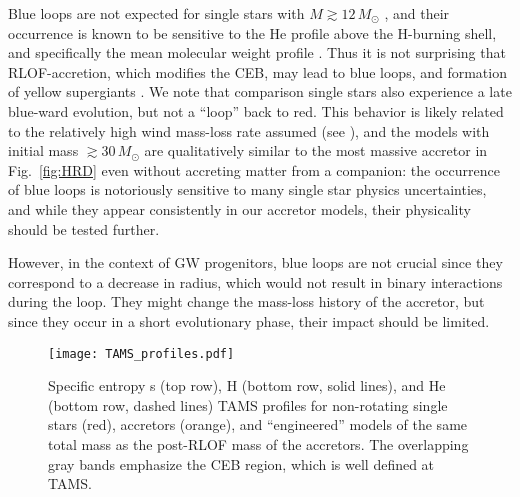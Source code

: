 \documentclass[twocolumn,twocolappendix,trackchanges]{aastex63}
\DeclareRobustCommand{\Figref}[1]{Fig.~\ref{#1}}
\begin{document}
Blue loops are not expected for single stars with
$M\gtrsim 12\,M_\odot$ \citep[e.g.,][]{walmswell:2015}, and their
occurrence is known to be sensitive to the He profile above the
H-burning shell, and specifically the mean molecular weight profile
\citep{walmswell:2015, farrell:22}. Thus it is not surprising that
RLOF-accretion, which modifies the CEB,
may lead to blue loops, and formation of yellow supergiants
\citep[e.g.,][]{dorn-wallenstein:20}. We note that comparison single
stars also experience a late blue-ward evolution, but not a ``loop''
back to red. This behavior is likely related to the relatively high
wind mass-loss rate assumed (see \citealt{renzo:2017}), and the models
with initial mass $\gtrsim 30\,M_\odot$ are qualitatively similar to
the most massive accretor in \Figref{fig:HRD} even without accreting
matter from a companion: the occurrence of blue loops is notoriously
sensitive to many single star physics uncertainties, and while they
appear consistently in our accretor models, their physicality should
be tested further.

However, in the context of GW progenitors, blue loops are not crucial
since they correspond to a decrease in radius, which would not result
in binary interactions during the loop. They might change the
mass-loss history of the accretor, but since they occur in a short
evolutionary phase, their impact should be
limited. %

\begin{figure*}[htbp]
  \centering
  \texttt{[image: TAMS\_profiles.pdf]}
  \caption{Specific entropy s (top row), H (bottom row, solid lines),
    and He (bottom row, dashed lines) TAMS profiles for non-rotating
    single stars (red), accretors (orange), and ``engineered'' models
    of the same total mass as the post-RLOF mass of the accretors. The
    overlapping gray bands emphasize the CEB region, which is well
    defined at TAMS.}
  \label{fig:TAMS_profiles}
\end{figure*}
\end{document}
